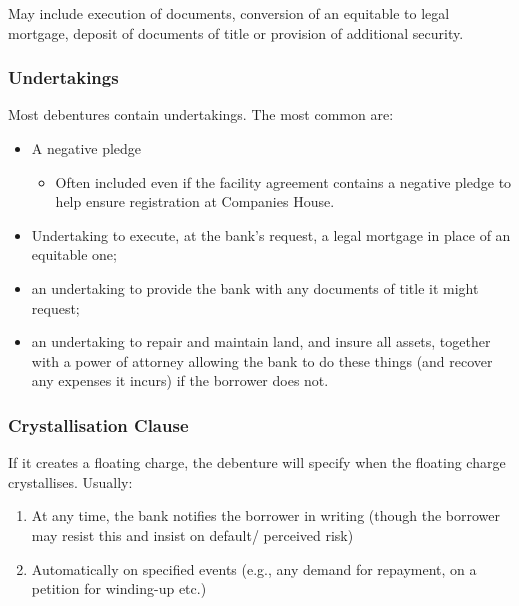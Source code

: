 \documentclass[
]{article}
\providecommand{\tightlist}{%
  \setlength{\itemsep}{0pt}\setlength{\parskip}{0pt}}
\begin{document}
May include execution of documents, conversion of an equitable to legal
mortgage, deposit of documents of title or provision of additional
security.

\hypertarget{undertakings}{%
\subsubsection{Undertakings}\label{undertakings}}

Most debentures contain undertakings. The most common are:

\begin{itemize}
\tightlist
\item
  A negative pledge

  \begin{itemize}
  \tightlist
  \item
    Often included even if the facility agreement contains a negative
    pledge to help ensure registration at Companies House.
  \end{itemize}
\item
  Undertaking to execute, at the bank's request, a legal mortgage in
  place of an equitable one;
\item
  an undertaking to provide the bank with any documents of title it
  might request;
\item
  an undertaking to repair and maintain land, and insure all assets,
  together with a power of attorney allowing the bank to do these things
  (and recover any expenses it incurs) if the borrower does not.
\end{itemize}

\hypertarget{crystallisation-clause}{%
\subsubsection{Crystallisation Clause}\label{crystallisation-clause}}

If it creates a floating charge, the debenture will specify when the
floating charge crystallises. Usually:

\begin{enumerate}
\tightlist
\item
  At any time, the bank notifies the borrower in writing (though the
  borrower may resist this and insist on default/ perceived risk)
\item
  Automatically on specified events (e.g., any demand for repayment, on
  a petition for winding-up etc.)
\end{enumerate}
\end{document}
